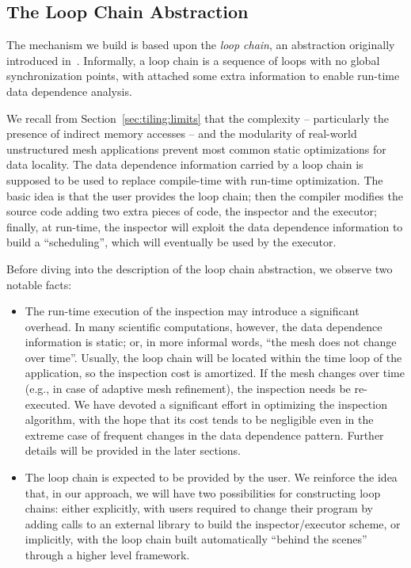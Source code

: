 \subsection{The Loop Chain Abstraction}
The mechanism we build is based upon the \textit{loop chain}, an abstraction originally introduced in~\cite{KriegerHIPS2013}. Informally, a loop chain is a sequence of loops with no global synchronization points, with attached some extra information to enable run-time data dependence analysis. 

We recall from Section~\ref{sec:tiling:limits} that the complexity -- particularly the presence of indirect memory accesses -- and the modularity of real-world unstructured mesh applications prevent most common static optimizations for data locality. The data dependence information carried by a loop chain is supposed to be used to replace compile-time with run-time optimization. The basic idea is that the user provides the loop chain; then the compiler modifies the source code adding two extra pieces of code, the inspector and the executor; finally, at run-time, the inspector will exploit the data dependence information to build a ``scheduling'', which will eventually be used by the executor. 

Before diving into the description of the loop chain abstraction, we observe two notable facts:
\begin{itemize}
\item The run-time execution of the inspection may introduce a significant overhead. In many scientific computations, however, the data dependence information is static; or, in more informal words, ``the mesh does not change over time''. Usually, the loop chain will be located within the time loop of the application, so the inspection cost is amortized. If the mesh changes over time (e.g., in case of adaptive mesh refinement), the inspection needs be re-executed. We have devoted a significant effort in optimizing the inspection algorithm,  with the hope that its cost tends to be negligible even in the extreme case of frequent changes in the data dependence pattern. Further details will be provided in the later sections. 
\item The loop chain is expected to be provided by the user. We reinforce the idea that, in our approach, we will have two possibilities for constructing loop chains: either explicitly, with users required to change their program by adding calls to an external library to build the inspector/executor scheme, or implicitly, with the loop chain built automatically ``behind the scenes'' through a higher level framework.
\end{itemize}

